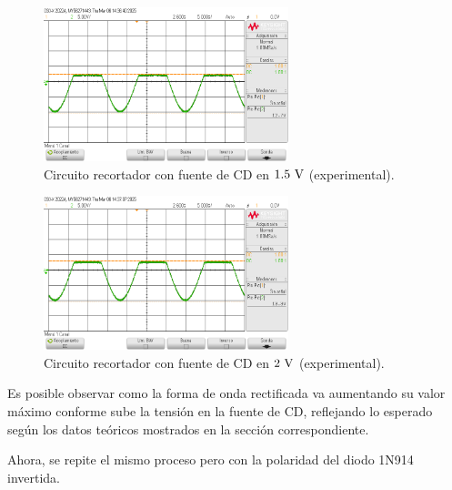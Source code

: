\documentclass[journal]{IEEEtran}
\begin{document}
\begin{figure}[H]
        \centering
        \includegraphics[width=2.8in]{SignalExperimental_09.png}
        \caption{Circuito recortador con fuente de CD en $1.5~\textnormal{V}$ (experimental).}
        \label{fig:SignalExperimental_09}
\end{figure}
\begin{figure}[H]
        \centering
        \includegraphics[width=2.8in]{SignalExperimental_10.png}
        \caption{Circuito recortador con fuente de CD en $2~\textnormal{V}$ (experimental).}
        \label{fig:SignalExperimental_10}
\end{figure}

Es posible observar como la forma de onda rectificada va aumentando su valor máximo conforme sube la tensión en la fuente de CD,
reflejando lo esperado según los datos teóricos mostrados en la sección correspondiente. 

Ahora, se repite el mismo proceso pero con la polaridad del diodo 1N914 invertida. 
\end{document}

